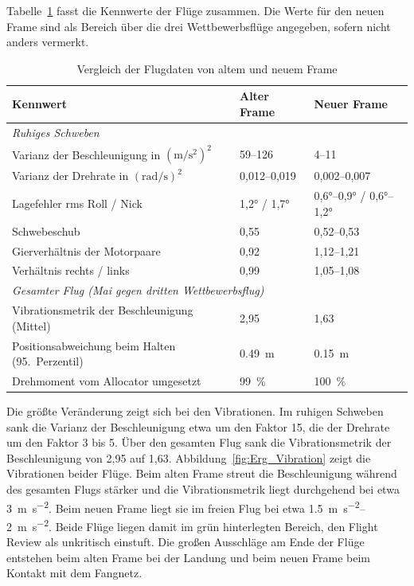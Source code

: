         Tabelle~\ref{tab:Erg_Flugvergleich} fasst die Kennwerte der Flüge zusammen. Die Werte für den neuen Frame sind als Bereich über die drei Wettbewerbsflüge angegeben, sofern nicht anders vermerkt.

        \begin{table}[H]
            \centering
            \caption{Vergleich der Flugdaten von altem und neuem Frame}
            \label{tab:Erg_Flugvergleich}
            \small
            \begin{tabularx}{\textwidth}{X l l}
                \toprule
                \textbf{Kennwert} & \textbf{Alter Frame} & \textbf{Neuer Frame} \\
                \midrule
                \multicolumn{3}{l}{\textit{Ruhiges Schweben}} \\
                Varianz der Beschleunigung in $(\mathrm{m}/\mathrm{s}^2)^2$ & 59--126 & 4--11 \\
                Varianz der Drehrate in $(\mathrm{rad}/\mathrm{s})^2$ & 0,012--0,019 & 0,002--0,007 \\
                Lagefehler \gls{rms} Roll / Nick & \ang{1,2} / \ang{1,7} & \ang{0,6}--\ang{0,9} / \ang{0,6}--\ang{1,2} \\
                Schwebeschub & 0,55 & 0,52--0,53 \\
                Gierverhältnis der Motorpaare & 0,92 & 1,12--1,21 \\
                Verhältnis rechts / links & 0,99 & 1,05--1,08 \\
                \midrule
                \multicolumn{3}{l}{\textit{Gesamter Flug (Mai gegen dritten Wettbewerbsflug)}} \\
                Vibrationsmetrik der Beschleunigung (Mittel) & 2,95 & 1,63 \\
                Positionsabweichung beim Halten (95.~Perzentil) & \SI{0,49}{\metre} & \SI{0,15}{\metre} \\
                Drehmoment vom Allocator umgesetzt & \SI{99}{\percent} & \SI{100}{\percent} \\
                \bottomrule
            \end{tabularx}
        \end{table}

        Die größte Veränderung zeigt sich bei den Vibrationen. Im ruhigen Schweben sank die Varianz der Beschleunigung etwa um den Faktor 15, die der Drehrate um den Faktor 3 bis 5. Über den gesamten Flug sank die Vibrationsmetrik der Beschleunigung von 2,95 auf 1,63. Abbildung~\ref{fig:Erg_Vibration} zeigt die Vibrationen beider Flüge. Beim alten Frame streut die Beschleunigung während des gesamten Flugs stärker und die Vibrationsmetrik liegt durchgehend bei etwa \SI{3}{\metre\per\second\squared}. Beim neuen Frame liegt sie im freien Flug bei etwa \SIrange{1,5}{2}{\metre\per\second\squared}. Beide Flüge liegen damit im grün hinterlegten Bereich, den Flight Review als unkritisch einstuft. Die großen Ausschläge am Ende der Flüge entstehen beim alten Frame bei der Landung und beim neuen Frame beim Kontakt mit dem Fangnetz.

